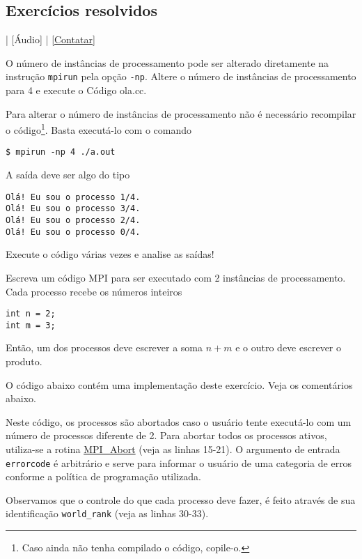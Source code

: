 \subsection*{Exercícios resolvidos}

\begin{flushright}
  [Vídeo] | [Áudio] | \href{https://phkonzen.github.io/notas/contato.html}{[Contatar]}
\end{flushright}

\begin{exeresol}
  O número de instâncias de processamento pode ser alterado diretamente na instrução \verb+mpirun+ pela opção \verb+-np+. Altere o número de instâncias de processamento para 4 e execute o Código ola.cc.
\end{exeresol}
\begin{resol}
  Para alterar o número de instâncias de processamento não é necessário recompilar o código\footnote{Caso ainda não tenha compilado o código, copile-o.}. Basta executá-lo com o comando
\begin{verbatim}
$ mpirun -np 4 ./a.out
\end{verbatim}
  A saída deve ser algo do tipo
\begin{verbatim}
Olá! Eu sou o processo 1/4.
Olá! Eu sou o processo 3/4.
Olá! Eu sou o processo 2/4.
Olá! Eu sou o processo 0/4.
\end{verbatim}
  Execute o código várias vezes e analise as saídas!
\end{resol}

\begin{exeresol}
  Escreva um código MPI para ser executado com 2 instâncias de processamento. Cada processo recebe os números inteiros
\begin{verbatim}
int n = 2;
int m = 3;
\end{verbatim}
Então, um dos processos deve escrever a soma $n+m$ e o outro deve escrever o produto.
\end{exeresol}
\begin{resol}
  O código abaixo contém uma implementação deste exercício. Veja os comentários abaixo.
  

  Neste código, os processos são abortados caso o usuário tente executá-lo com um número de processos diferente de 2. Para abortar todos os processos ativos, utiliza-se a rotina \href{https://www.open-mpi.org/doc/v4.1/man3/MPI\_Abort.3.php}{MPI\_Abort} (veja as linhas 15-21). O argumento de entrada \verb+errorcode+ é arbitrário e serve para informar o usuário de uma categoria de erros conforme a política de programação utilizada.

  Observamos que o controle do que cada processo deve fazer, é feito através de sua identificação \verb+world_rank+ (veja as linhas 30-33).
\end{resol}

